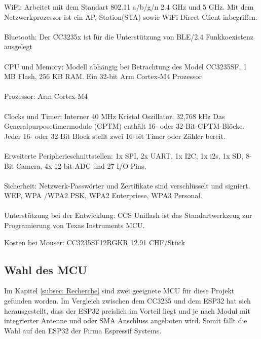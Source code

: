 WiFi: Arbeitet mit dem Standart 802.11 a/b/g/n 2.4 GHz und 5 GHz. Mit dem Netzwerkprozessor ist ein AP, Station(STA) sowie WiFi Direct Client inbegriffen.\\
\\
Bluetooth:
Der CC3235x ist für die Unterstützung von BLE/2,4 Funkkoexistenz ausgelegt\\
\\
CPU und Memory: Modell abhängig bei Betrachtung des Model CC3235SF, 1 MB Flash, 256 KB RAM. Ein 32-bit Arm Cortex-M4 Prozessor \\
\\
Prozessor: Arm Cortex-M4\\
\\
Clocks und Timer:
Interner 40 MHz Kristal Oszillator, 32,768 kHz  
Das Generalpurposetimermodule (GPTM) enthält 16- oder 32-Bit-GPTM-Blöcke. Jeder 16-  oder 32-Bit Block stellt zwei 16-bit Timer oder Zähler bereit.\\
\\
Erweiterte Peripherieschnittstellen:
1x SPI, 2x UART, 1x I2C, 1x i2s, 1x SD, 8-Bit Camera, 4x 12-bit ADC und 27 I/O Pins.\\
\\
Sicherheit:
Netzwerk-Passwörter und Zertifikate sind verschlüsselt und signiert. WEP, WPA /WPA2 PSK, WPA2 Enterpriese, WPA3 Personal.\\
\\
Unterstützung bei der Entwicklung:
CCS Uniflash ist das Standartwerkzeug zur Programierung von Texas Instruments MCU.

Kosten bei Mouser:
CC3235SF12RGKR 12.91 CHF/Stück

\subsection{Wahl des MCU}
 
 Im Kapitel \ref{subsec: Recherche} sind zwei geeignete MCU für diese Projekt gefunden worden. Im Vergleich zwischen dem CC3235 und dem ESP32 hat sich herausgestellt, dass der ESP32 preislich im Vorteil liegt und je nach Modul mit integrierter Antenne und oder SMA Anschluss angeboten wird. Somit fällt die Wahl auf den ESP32 der Firma Espressif Systems.
